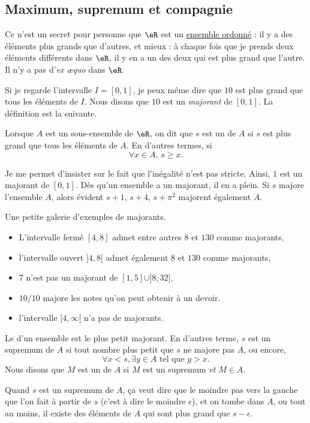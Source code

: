 \subsection{Maximum, supremum et compagnie}

Ce n'est un secret pour personne que $\eR$ est un \href{http://fr.wikipedia.org/wiki/Relation_d'ordre}{ensemble ordonné} : il y a des éléments plus grands que d'autres, et mieux : à chaque fois que je prends deux éléments différents dans $\eR$, il y en a un des deux qui est plus grand que l'autre. Il n'y a pas d'\emph{ex æquo} dans $\eR$.

  Si je regarde l'intervalle $I=[0,1]$, je peux même dire que $10$ est plus grand que tous les éléments de $I$. Nous disons que $10$ est un \emph{majorant} de $[0,1]$. La définition est la suivante.
\begin{definition}
Lorsque $A$ est un sous-ensemble de $\eR$, on dit que $s$ est un  de $A$ si $s$ est plus grand que tous les éléments de $A$. En d'autres termes, si
\[
  \forall x\in A,\,s\geq x.
\]
\end{definition}
Je me permet d'insister sur le fait que l'inégalité n'est pas stricte. Ainsi, $1$ est un majorant de $[0,1]$. Dès qu'un ensemble a un majorant, il en a plein. Si $s$ majore l'ensemble $A$, alors évident $s+1$, $s+4$, $s+\pi^2$ majorent également $A$.

\begin{example}
Une petite galerie d'exemples de majorants.
\begin{itemize}
\item L'intervalle fermé $[4,8]$ admet entre autres $8$ et $130$ comme majorants,
\item l'intervalle ouvert $]4,8[$ admet également $8$ et $130$ comme majorants,
\item $7$ n'est pas un majorant de $[1,5]\cup]8,32]$,
\item $10/10$ majore les notes qu'on peut obtenir à un devoir.
\item l'intervalle $[4,\infty[$ n'a pas de majorants.
\end{itemize}
\end{example}

\begin{definition}
Le  d'un ensemble est le plus petit majorant. En d'autres terme, $s$ est un supremum de $A$ si tout nombre plus petit que $s$ ne majore pas $A$, ou encore,
\[
  \forall x<s,\exists y\in A\text{ tel que } y>x.
\]
Nous disons que $M$ est un  de $A$ si $M$ est un supremum \emph{et} $M\in A$.
\end{definition}
Quand $s$ est un supremum de $A$, ça veut dire que le moindre pas vers la gauche que l'on fait à partir de $s$ (c'est à dire le moindre $\epsilon$), et on tombe dans $A$, ou tout au moins, il existe des éléments de $A$ qui sont plus grand que $s-\epsilon$.

